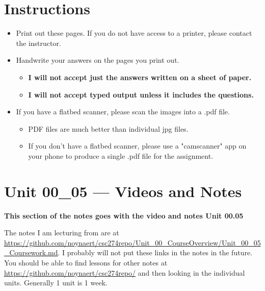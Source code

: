 \documentclass[letterpaper,12pt]{exam}
\begin{document}
\section*{Instructions}
\begin{itemize}
	\item Print out these pages.  If you do not have access to a printer, please contact the instructor.
	\item Handwrite your answers on the pages you print out. 
	   \begin{itemize}
		  \item \textbf{I will not accept just the answers written on a sheet of paper.}  
		  \item \textbf{I will not accept typed output unless it includes the questions.}
	   \end{itemize}
	\item If you have a flatbed scanner, please scan the images into a .pdf file.  
	  \begin{itemize}
         \item PDF files are much better than individual jpg files.
         \item If you don't have a flatbed scanner, please use a "camscanner" app on your phone to produce a single .pdf file for the assignment.
      \end{itemize}
\end{itemize}

\section*{Unit 00\_05 --- Videos and Notes} %

\begin{center}
\textbf{This section of the notes goes with the video and notes Unit 00.05}

The notes I am lecturing from are at \url{https://github.com/noynaert/csc274repo/Unit_00_CourseOverview/Unit_00_05_Coursework.md}.
I probably will not put these links in the notes in the future.  You should be able to find lessons for other notes at 
\url{https://github.com/noynaert/csc274repo/} and then looking in the individual units.  Generally 1 unit is 1 week.
\end{center}
\end{document}
